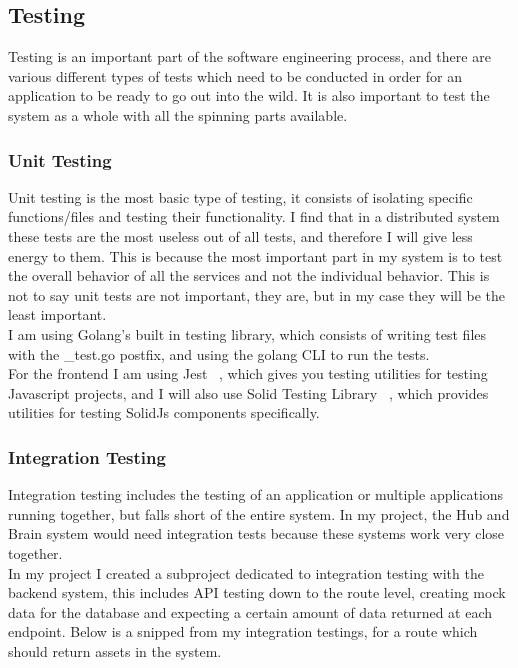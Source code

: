 \documentclass[titlepage]{article}
\begin{document}
\subsection{Testing}
Testing is an important part of the software engineering process, and there are various different types of tests which need to be conducted in order for an application to be ready to go out into the wild. It is also important to test the system as a whole with all the spinning parts available.

\subsubsection{Unit Testing}
Unit testing is the most basic type of testing, it consists of isolating specific functions/files and testing their functionality. I find that in a distributed system these tests are the most useless out of all tests, and therefore I will give less energy to them. This is because the most important part in my system is to test the overall behavior of all the services and not the individual behavior. This is not to say unit tests are not important, they are, but in my case they will be the least important. \\

I am using Golang's built in testing library, which consists of writing test files with the \_test.go postfix, and using the golang CLI to run the tests. \\

For the frontend I am using Jest ~\cite{jest}, which gives you testing utilities for testing Javascript projects, and I will also use Solid Testing Library ~\cite{solid_testing}, which provides utilities for testing SolidJs components specifically.

\subsubsection{Integration Testing}
Integration testing includes the testing of an application or multiple applications running together, but falls short of the entire system. In my project, the Hub and Brain system would need integration tests because these systems work very close together. \\

In my project I created a subproject dedicated to integration testing with the backend system, this includes API testing down to the route level, creating mock data for the database and expecting a certain amount of data returned at each endpoint. Below is a snipped from my integration testings, for a route which should return assets in the system.
\end{document}
